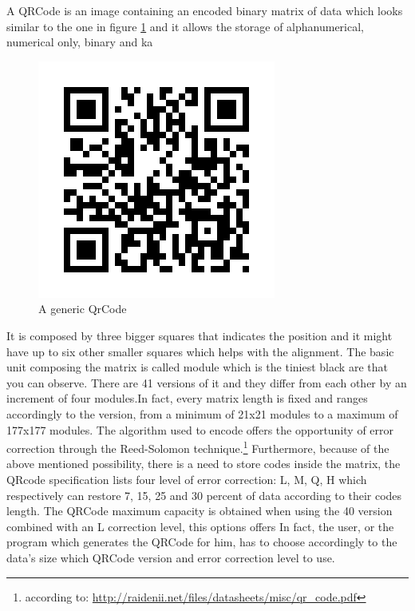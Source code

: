 A QRCode is an image containing an encoded binary matrix of data which looks similar to the one in figure \ref{qr} and it allows the storage of alphanumerical, numerical only, binary and ka

\begin{figure}[hbt]
    \centering
    \includegraphics[scale=0.5]{img/qr.png}
    \caption{A generic QrCode}
    \label{qr}
\end{figure}

It is composed by three bigger squares that indicates the position and it might have up to six other smaller squares which helps with the alignment. The basic unit composing the matrix is called module which is the tiniest black are that you can observe. There are 41 versions of it and they differ from each other by an increment of four modules.In fact, every matrix length is fixed and ranges accordingly to the version, from a minimum of 21x21 modules to a maximum of 177x177 modules. The algorithm used to encode offers the opportunity of error correction through the Reed-Solomon technique.\footnote{ according to: \url{http://raidenii.net/files/datasheets/misc/qr_code.pdf}}
Furthermore, because of the above mentioned possibility, there is a need to store codes inside the matrix, the QRcode specification lists four level of error correction: L, M, Q, H which respectively can restore 7, 15, 25 and 30 percent of data according to their codes length.
The QRCode maximum capacity is obtained when using the 40 version combined with an L correction level, this options offers 
In fact, the user, or the program which generates the QRCode for him, has to choose accordingly to the data's size which QRCode version and error correction level to use.

